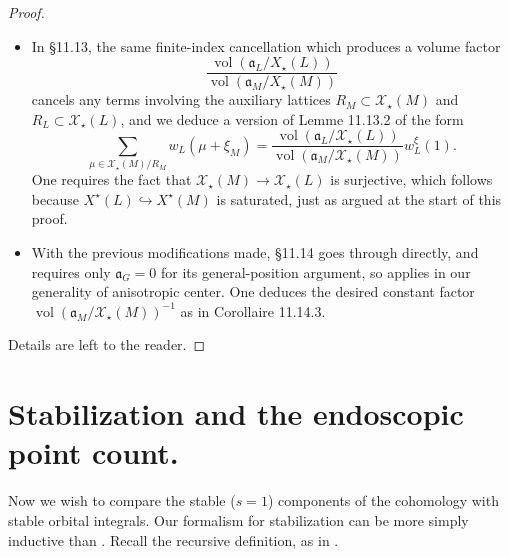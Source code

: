 \documentclass[openany]{amsbook}
\theoremstyle{definition}
\theoremstyle{remark}
\numberwithin{equation}{section}
\newcommand{\cX}{\mathcal{X}}
\newcommand{\vol}{\operatorname{vol}}
\renewcommand{\-}{\operatorname{-}}
\renewcommand{\a}{\mathfrak{a}}
\begin{document}
\begin{proof}
\begin{itemize}
$$        $$
        so that indeed $(w_{P,N})_P$ is a $(G,M)$-family. 
        \item In \S 11.13, the same finite-index cancellation which produces a volume factor
        $$
            \frac{\vol(\a_L/X_\star(L))}{\vol(\a_M/X_\star(M))}
        $$
        cancels any terms involving the auxiliary lattices $R_M \subset \cX_\star(M)$ and $R_L \subset \cX_\star(L)$, and we deduce a version of Lemme 11.13.2 of the form
        $$
            \sum_{\mu \in \cX_\star(M)/R_M} w_L(\mu + \xi_M) = \frac{\vol(\a_L/\cX_\star(L))}{\vol(\a_M/\cX_\star(M))} w_L^\xi(1).
        $$
        One requires the fact that $\cX_\star(M) \to \cX_\star(L)$ is surjective, which follows because $X^\star(L) \hookrightarrow X^\star(M)$ is saturated, just as argued at the start of this proof.
        \item With the previous modifications made, \S 11.14 goes through directly, and requires only $\a_G = 0$ for its general-position argument, so applies in our generality of anisotropic center. One deduces the desired constant factor $\vol(\a_M/\cX_\star(M))^{-1}$ as in Corollaire 11.14.3.
    \end{itemize}
    Details are left to the reader.
\end{proof}





























\section{Stabilization and the endoscopic point count.}

Now we wish to compare the stable ($s = 1$) components of the cohomology with stable orbital integrals. Our formalism for stabilization can be more simply inductive than \cite[\S 13]{CLII}. Recall the recursive definition, as in \cite{ArthurStableI}.
\end{document}
